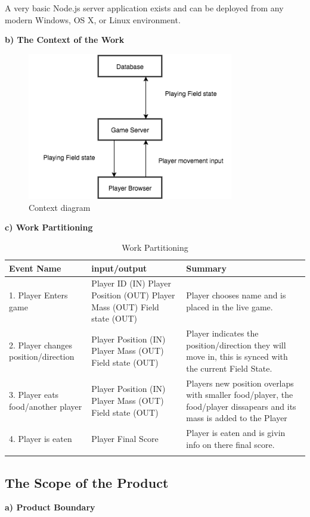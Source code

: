 \documentclass[12pt]{article}
\begin{document}
	A very basic Node.js server application exists and can be deployed from any
	modern Windows, OS X, or Linux environment.
	
	\textbf{b) The Context of the Work}
	\begin{figure}[H]
	\centering
	\includegraphics[width=90mm]{contextsrs.png}
	\caption{Context diagram \label{overflow}}
	\end{figure}
	
	\textbf{c) Work Partitioning}

    \begin{longtable}{ | l | p{3cm}  | p{3cm} |}
    \hline
    Event Name & input/output & Summary \\ \hline
    1. Player Enters game & Player ID (IN) Player Position (OUT) Player Mass (OUT) Field state (OUT) & Player chooses name and is placed in the live game. \\ \hline
    2. Player changes position/direction & Player Position (IN) Player Mass (OUT) Field state (OUT) & Player indicates the position/direction they will move in, this is synced with the current Field State. \\ \hline
    3. Player eats food/another player & Player Position (IN) Player Mass (OUT) Field state (OUT) & Players new position overlaps with smaller food/player, the food/player dissapears and its mass is added to the Player\\ \hline
    4. Player is eaten & Player Final Score & Player is eaten and is givin info on there final score.\\ \hline
    \caption{Work Partitioning}
    \end{longtable}
\subsection{The Scope of the Product}
\textbf{a) Product Boundary}
\end{document}
